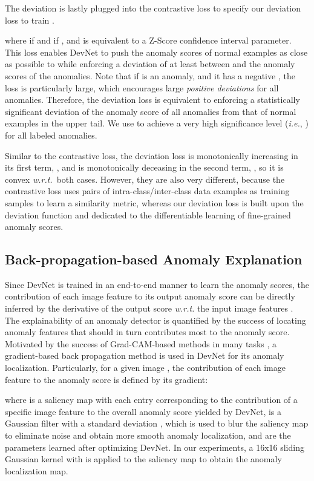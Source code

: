 \documentclass[10pt,journal,compsoc]{IEEEtran}
\begin{document}
The deviation is lastly plugged into the contrastive loss \cite{hadsell2006contrastloss} to specify our deviation loss to train .

where  if  and  if , and  is equivalent to a Z-Score confidence interval parameter. This loss enables DevNet to push the anomaly scores of normal examples as close as possible to  while enforcing a deviation of at least  between  and the anomaly scores of the anomalies. Note that if  is an anomaly, and it has a negative , the loss is particularly large, which encourages large \textit{positive deviations} for all anomalies. Therefore, the deviation loss is equivalent to enforcing a statistically significant deviation of the anomaly score of all anomalies from that of normal examples in the upper tail. We use  to achieve a very high significance level (\textit{i.e.}, 
) for all labeled anomalies. 

Similar to the contrastive loss, the deviation loss is monotonically increasing in its first term, , and is monotonically deceasing in the second term, , so it is convex \textit{w.r.t.}\   both cases. However, they are also very different, because the contrastive loss uses pairs of intra-class/inter-class data examples as training samples to learn a similarity metric, whereas our deviation loss is built upon the deviation function and dedicated to the differentiable learning of fine-grained anomaly scores.



\subsection{Back-propagation-based Anomaly Explanation}\label{subsec:explanation_method} 

Since DevNet is trained in an end-to-end manner to learn the anomaly scores, the contribution of each image feature to its output anomaly score can be directly inferred by the derivative of the output score \textit{w.r.t.} the input image features \cite{selvaraju2017grad}. The explainability of an anomaly detector is quantified by the success of locating anomaly features that should in turn contributes most to the anomaly score. 
Motivated by the success of Grad-CAM-based methods in many tasks \cite{du2019techniques}, a gradient-based back propagation method is used in DevNet for its anomaly localization. Particularly, for a given image , the contribution of each image feature  to the anomaly score is defined by its gradient:

where  is a saliency map with each entry  corresponding to the contribution of a specific image feature to the overall anomaly score yielded by DevNet,  is a Gaussian filter with a standard deviation , which is used to blur the saliency map to eliminate noise and obtain more smooth anomaly localization, and  are the parameters learned after optimizing DevNet. In our experiments, a 16x16 sliding Gaussian kernel with  is applied to the saliency map to obtain the anomaly localization map.
\end{document}
